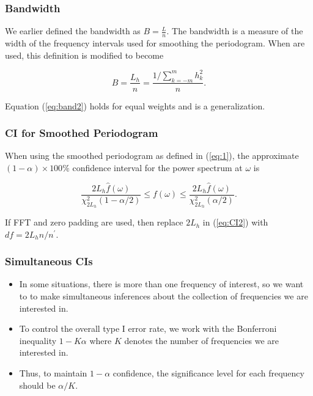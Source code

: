 \documentclass[%
xcolor=pdftex]{beamer}
\begin{document}
\begin{frame}
\frametitle{Bandwidth}

We earlier defined the bandwidth as $B = \frac{L}{n}$. The bandwidth is a measure of the width of the frequency intervals used for smoothing the periodogram. When \underline{\hspace{30 mm}} are used, this definition is modified to become

\begin{equation} \label{eq:band2}
B = \frac{L_h}{n} = \frac{1/ \sum_{k=-m}^{m} h_k^2}{n}.
\end{equation}

Equation (\ref{eq:band2}) holds for equal weights and is a generalization.

\end{frame}

\begin{frame}
\frametitle{CI for Smoothed Periodogram}

When using the smoothed periodogram as defined in (\ref{eq:1}), the approximate $(1-\alpha) \times 100\%$ confidence interval for the power spectrum at $\omega$ is

\begin{equation} \label{eq:CI2}
\frac{2 L_h   \widehat{f}(\omega)}{{\chi_{2L_h}^2(1-\alpha/2)}} \leq f(\omega) \leq \frac{2 L_h  \widehat{f}(\omega) }{{\chi_{2L_h}^2(\alpha/2)}} .
\end{equation}


If FFT and zero padding are used, then replace $2 L_h$ in (\ref{eq:CI2}) with $df = 2 L_h n / n^\prime$.


\end{frame}

\begin{frame}
\frametitle{Simultaneous CIs}

\begin{itemize}
\item In some situations, there is more than one frequency of interest, so we want to to make simultaneous inferences about the collection of frequencies we are interested in. 

\item To control the overall type I error rate, we work with the Bonferroni inequality $1 - K \alpha$ where $K$ denotes the number of frequencies we are interested in. 

\item Thus, to maintain $1 - \alpha$ confidence, the significance level for each frequency should be $\alpha/K$. 

\end{itemize}

\end{frame}
\end{document}
